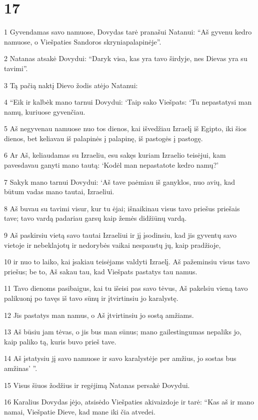 \chapter{17}


\par 1 Gyvendamas savo namuose, Dovydas tarė pranašui Natanui: “Aš gyvenu kedro namuose, o Viešpaties Sandoros skrynia­palapinėje”. 
\par 2 Natanas atsakė Dovydui: “Daryk visa, kas yra tavo širdyje, nes Dievas yra su tavimi”. 
\par 3 Tą pačią naktį Dievo žodis atėjo Natanui: 
\par 4 “Eik ir kalbėk mano tarnui Dovydui: ‘Taip sako Viešpats: ‘Tu nepastatysi man namų, kuriuose gyvenčiau. 
\par 5 Aš negyvenau namuose nuo tos dienos, kai išvedžiau Izraelį iš Egipto, iki šios dienos, bet keliavau iš palapinės į palapinę, iš pastogės į pastogę. 
\par 6 Ar Aš, keliaudamas su Izraeliu, esu sakęs kuriam Izraelio teisėjui, kam pavesdavau ganyti mano tautą: ‘Kodėl man nepastatote kedro namų?’ 
\par 7 Sakyk mano tarnui Dovydui: ‘Aš tave paėmiau iš ganyklos, nuo avių, kad būtum vadas mano tautai, Izraeliui. 
\par 8 Aš buvau su tavimi visur, kur tu ėjai; išnaikinau visus tavo priešus priešais tave; tavo vardą padariau garsų kaip žemės didžiūnų vardą. 
\par 9 Aš paskirsiu vietą savo tautai Izraeliui ir jį įsodinsiu, kad jis gyventų savo vietoje ir nebeklajotų ir nedorybės vaikai nespaustų jų, kaip pradžioje, 
\par 10 ir nuo to laiko, kai įsakiau teisėjams valdyti Izraelį. Aš pažeminsiu visus tavo priešus; be to, Aš sakau tau, kad Viešpats pastatys tau namus. 
\par 11 Tavo dienoms pasibaigus, kai tu išeisi pas savo tėvus, Aš pakelsiu vieną tavo palikuonį po tavęs iš tavo sūnų ir įtvirtinsiu jo karalystę. 
\par 12 Jis pastatys man namus, o Aš įtvirtinsiu jo sostą amžiams. 
\par 13 Aš būsiu jam tėvas, o jis bus man sūnus; mano gailestingumas nepaliks jo, kaip paliko tą, kuris buvo prieš tave. 
\par 14 Aš įstatysiu jį savo namuose ir savo karalystėje per amžius, jo sostas bus amžinas’ ”. 
\par 15 Visus šiuos žodžius ir regėjimą Natanas persakė Dovydui. 
\par 16 Karalius Dovydas įėjo, atsisėdo Viešpaties akivaizdoje ir tarė: “Kas aš ir mano namai, Viešpatie Dieve, kad mane iki čia atvedei. 
